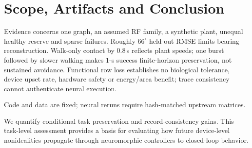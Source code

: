 \section{Scope, Artifacts and Conclusion}
Evidence concerns one graph, an assumed RF family, a synthetic plant, unequal healthy reserve and sparse failures. Roughly $66^\circ$ held-out RMSE limits bearing reconstruction. Walk-only contact by 0.8\,s reflects plant speeds; one burst followed by slower walking makes 1-s success finite-horizon preservation, not sustained avoidance. Functional row loss establishes no biological tolerance, device upset rate, hardware safety or energy/area benefit; trace consistency cannot authenticate neural execution.

Code and data are fixed\cite{artifactEngineering}; neural reruns require hash-matched upstream matrices.

We quantify conditional task preservation and record-consistency gains. This task-level assessment provides a basis for evaluating how future device-level nonidealities propagate through neuromorphic controllers to closed-loop behavior.
